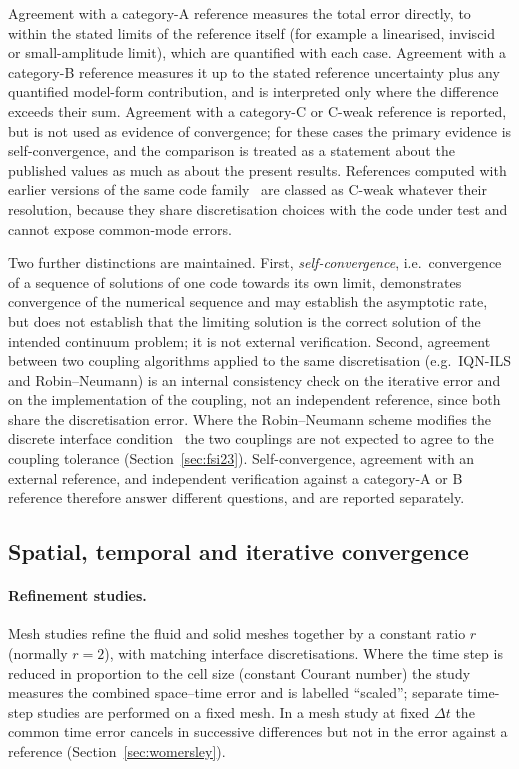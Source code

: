 Agreement with a category-A reference measures the total error directly, to within the stated limits of the reference itself (for example a linearised, inviscid or small-amplitude limit), which are quantified with each case.
Agreement with a category-B reference measures it up to the stated reference uncertainty plus any quantified model-form contribution, and is interpreted only where the difference exceeds their sum.
Agreement with a category-C or C-weak reference is reported, but is not used as evidence of convergence; for these cases the primary evidence is self-convergence, and the comparison is treated as a statement about the published values as much as about the present results.
References computed with earlier versions of the same code family~\citep{Tukovic2018} are classed as C-weak whatever their resolution, because they share discretisation choices with the code under test and cannot expose common-mode errors.

Two further distinctions are maintained.
First, \emph{self-convergence}, i.e.\ convergence of a sequence of solutions of one code towards its own limit, demonstrates convergence of the numerical sequence and may establish the asymptotic rate, but does not establish that the limiting solution is the correct solution of the intended continuum problem; it is not external verification.
Second, agreement between two coupling algorithms applied to the same discretisation (e.g.\ IQN-ILS and Robin--Neumann) is an internal consistency check on the iterative error and on the implementation of the coupling, not an independent reference, since both share the discretisation error.
Where the Robin--Neumann scheme modifies the discrete interface condition~\citep{Tukovic2018b} the two couplings are not expected to agree to the coupling tolerance (Section~\ref{sec:fsi23}).
Self-convergence, agreement with an external reference, and independent verification against a category-A or B reference therefore answer different questions, and are reported separately.

\subsection{Spatial, temporal and iterative convergence}\label{sec:convergence_method}

\paragraph{Refinement studies.}
Mesh studies refine the fluid and solid meshes together by a constant ratio $r$ (normally $r=2$), with matching interface discretisations.
Where the time step is reduced in proportion to the cell size (constant Courant number) the study measures the combined space--time error and is labelled ``scaled''; separate time-step studies are performed on a fixed mesh.
In a mesh study at fixed $\Delta t$ the common time error cancels in successive differences but not in the error against a reference (Section~\ref{sec:womersley}).

